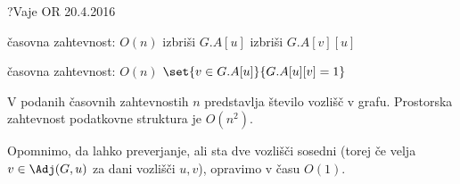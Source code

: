 \begin{naloga}{?}{Vaje OR 20.4.2016}
\begin{odgovor}
\begin{small}
\begin{algorithmic}
 \hfill časovna zahtevnost: $O(n)$
    \State izbriši $G.A[u]$
        \State izbriši $G.A[v][u]$
    \EndFor
\EndFunction
\end{algorithmic}

\begin{algorithmic}
 \hfill časovna zahtevnost: $O(n)$
    \State \Return $\set{v \in G.A[u]}{G.A[u][v] = 1}$
\EndFunction
\end{algorithmic}
\end{small}
V podanih časovnih zahtevnostih $n$ predstavlja število vozlišč v grafu.
Prostorska zahtevnost podatkovne struktura je $O(n^2)$.

Opomnimo, da lahko preverjanje, ali sta dve vozlišči sosedni
(torej če velja $v \in \Adj(G, u)$ za dani vozlišči $u, v$),
opravimo v času $O(1)$.
\end{odgovor}
\end{naloga}
